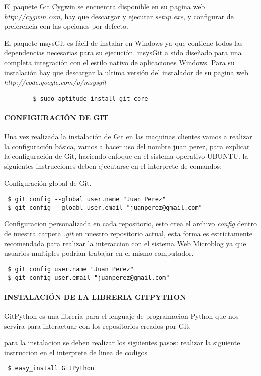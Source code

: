 El paquete Git Cygwin se encuentra disponible en su pagina web \textit{http://cygwin.com}, hay que descargar y ejecutar \textit{setup.exe}, y configurar de preferencia
con las opciones por defecto.

El paquete msysGit es fácil de instalar en Windows ya que contiene todos las dependencias necesarias para su ejecución. msysGit a sido diseñado para una completa integración 
con el estilo nativo de aplicaciones Windows. Para su instalación hay que descargar la ultima versión del instalador de su pagina web \textit{http://code.google.com/p/msysgit}
	\begin{verbatim}
 		$ sudo aptitude install git-core
	\end{verbatim}
\paragraph{CONFIGURACIÓN DE GIT}
Una vez realizada la instalación de Git en las maquinas clientes vamos a realizar la configuración básica, vamos a hacer uso del nombre juan perez, para explicar la configuración de Git, haciendo enfoque en el sistema operativo UBUNTU.
la siguientes instrucciones deben ejecutarse en el interprete de comandos:

Configuración global de Git.
\begin{verbatim}
 $ git config --global user.name "Juan Perez"
 $ git config --gloabl user.email "juanperez@gmail.com"
\end{verbatim}
Configuracion personalizada en cada repositorio, esto crea el archivo \textit{config} dentro de nuestra carpeta \textit{.git} en nuestro repositorio actual, esta forma es
estrictamente recomendada para realizar la interaccion con el sistema Web Microblog ya que usuarios multiples podrian trabajar en el mismo computador.
\begin{verbatim}
 $ git config user.name "Juan Perez"
 $ git config user.email "juanperez@gmail.com"
\end{verbatim}
\paragraph{INSTALACIÓN DE LA LIBRERIA GITPYTHON}
GitPython es una libreria para el lenguaje de programacion Python que nos servira para interactuar con
los repositorios creados por Git.

para la instalacion se deben realizar los siguientes pasos:
realizar la siguiente instruccion en el interprete de linea de codigos
\begin{verbatim}
 $ easy_install GitPython
\end{verbatim}

